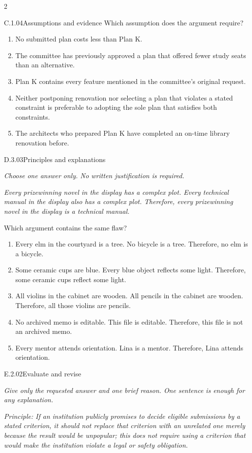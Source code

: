 \documentclass[9pt]{extarticle}
\newcommand{\choice}[1]{\item #1}
\begin{document}
\begin{multicols}{2}
\begin{DenseCoreProblem}{C.1.04}{Assumptions and evidence}
Which assumption does the argument require?
\begin{enumerate}[label=(\alph*)]
  \choice{No submitted plan costs less than Plan K.}
  \choice{The committee has previously approved a plan that offered fewer study seats than an alternative.}
  \choice{Plan K contains every feature mentioned in the committee's original request.}
  \choice{Neither postponing renovation nor selecting a plan that violates a stated constraint is preferable to adopting the sole plan that satisfies both constraints.}
  \choice{The architects who prepared Plan K have completed an on-time library renovation before.}
\end{enumerate}
\end{DenseCoreProblem}
\begin{DenseCoreProblem}{D.3.03}{Principles and explanations}
{\scriptsize\textit{Choose one answer only. No written justification is required.}\par}
\emph{Every prizewinning novel in the display has a complex plot. Every technical manual in the display also has a complex plot. Therefore, every prizewinning novel in the display is a technical manual.}

Which argument contains the same flaw?
\begin{enumerate}[label=(\alph*)]
  \choice{Every elm in the courtyard is a tree. No bicycle is a tree. Therefore, no elm is a bicycle.}
  \choice{Some ceramic cups are blue. Every blue object reflects some light. Therefore, some ceramic cups reflect some light.}
  \choice{All violins in the cabinet are wooden. All pencils in the cabinet are wooden. Therefore, all those violins are pencils.}
  \choice{No archived memo is editable. This file is editable. Therefore, this file is not an archived memo.}
  \choice{Every mentor attends orientation. Lina is a mentor. Therefore, Lina attends orientation.}
\end{enumerate}
\end{DenseCoreProblem}
\begin{DenseCoreProblem}{E.2.02}{Evaluate and revise}
{\scriptsize\textit{Give only the requested answer and one brief reason. One sentence is enough for any explanation.}\par}
\emph{Principle: If an institution publicly promises to decide eligible submissions by a stated criterion, it should not replace that criterion with an unrelated one merely because the result would be unpopular; this does not require using a criterion that would make the institution violate a legal or safety obligation.}


\end{DenseCoreProblem}
\end{multicols}
\end{document}
